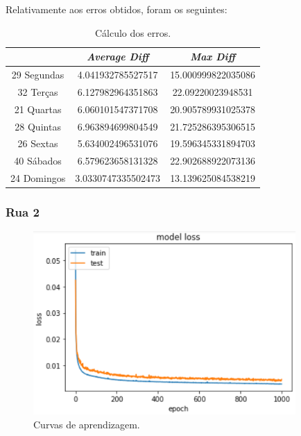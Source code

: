\documentclass[a4paper, 12pt]{article}
\begin{document}
Relativamente aos erros obtidos, foram os seguintes:

\begin{table}[H]
	\centering
	\begin{tabular}{||c||c|c||}
		\hline\hline
		& \textit{Average Diff} & \textit{Max Diff} \\
		\hline\hline
		29 Segundas & 4.041932785527517
 & 15.000999822035086 \\
		\hline
		32 Terças  &

6.127982964351863 & 22.09220023948531\\
		\hline
		21 Quartas & 6.060101547371708
 & 20.905789931025378	\\
		\hline
		28 Quintas  & 
6.963894699804549
 & 21.725286395306515	\\
		\hline
		26 Sextas & 5.634002496531076
 & 19.596345331894703 \\
		\hline
		40 Sábados  & 6.579623658131328
 & 22.902688922073136 \\
		\hline
		24 Domingos & 3.0330747335502473
 & 13.139625084538219

\\
		\hline\hline
	\end{tabular}
	\label{table:mod1_rua4}
	\caption{Cálculo dos erros.}
\end{table}



\subsubsection{Rua 2}

\begin{figure}[H]
	\centering
	\includegraphics[width=10cm]{resultados/curvas_aprend_2.png}
	\caption{Curvas de aprendizagem.}
\end{figure}
\end{document}
